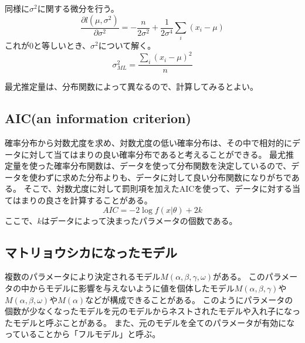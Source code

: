 同様に$\sigma^2$に関する微分を行う。
\begin{equation*}
    \frac{\partial l(\mu,\sigma^2)}{\partial \sigma^2} = -\frac{n}{2\sigma^2}+\frac{1}{2\sigma^4}\sum_i(x_i-\mu)
\end{equation*}
これが$0$と等しいとき、$\sigma^2$について解く。
\begin{equation*}
    \sigma^2_{ML} = \frac{\sum_i(x_i-\mu)^2}{n}
\end{equation*}

最尤推定量は、分布関数によって異なるので、計算してみるとよい。

\subsection{AIC(an information criterion)}
確率分布から対数尤度を求め、対数尤度の低い確率分布は、その中で相対的にデータに対して当てはまりの良い確率分布であると考えることができる。
最尤推定量を使った確率分布関数は、データを使って分布関数を決定しているので、データを使わずに求めた分布よりも、データに対して良い分布関数になりがちである。
そこで、対数尤度に対して罰則項を加えたAICを使って、データに対する当てはまりの良さを計算することがある。
\begin{equation*}
    AIC = -2\log f(x|\theta)+2k
\end{equation*}
ここで、$k$はデータによって決まったパラメータの個数である。

\subsection{マトリョウシカになったモデル}
複数のパラメータにより決定されるモデル$M(\alpha,\beta,\gamma,\omega)$がある。
このパラメータの中からモデルに影響を与えないように値を個体したモデル$M(\alpha,\beta,\gamma)$や$M(\alpha,\beta,\omega)$や$M(\alpha)$などが構成できることがある。
このようにパラメータの個数が少なくなったモデルを元のモデルからネストされたモデルや入れ子になったモデルと呼ぶことがある。
また、元のモデルを全てのパラメータが有効になっていることから「フルモデル」と呼ぶ。


